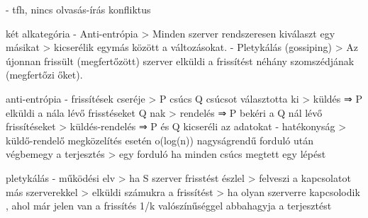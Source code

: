 \documentclass[12pt]{article}
\begin{document}
\begin{description}
                                                                        - tfh, nincs olvasás-írás konfliktus
                                                                    \item két alkategória
                                                                        - Anti-entrópia
                                                                        > Minden szerver rendszeresen kiválaszt egy másikat
                                                                        > kicserélik egymás között a változásokat.
                                                                        - Pletykálás (gossiping)
                                                                        > Az újonnan frissült (megfertőzött) szerver elküldi a frissítést néhány szomszédjának (megfertőzi őket).
                                                                    \item anti-entrópia
                                                                        - frissítések cseréje
                                                                        > P csúcs Q csúcsot választotta ki
                                                                        > küldés   ⇒ P elküldi a nála lévő frisstéseket Q nak
                                                                        > rendelés ⇒ P bekéri a Q nál lévő frissítéseket
                                                                        > küldés-rendelés ⇒ P és Q kicseréli az adatokat
                                                                        - hatékonyság
                                                                        > küldő-rendelő megközelítés esetén o(log(n)) nagyságrendű forduló után végbemegy a terjesztés
                                                                        > egy forduló ha minden csúcs megtett egy lépést
                                                                    \item pletykálás
                                                                        - működési elv
                                                                        > ha S szerver frisstést észlel
                                                                        > felveszi a kapcsolatot más szerverekkel 
                                                                        > elküldi számukra a frissítést
                                                                        > ha olyan szerverre kapcsolodik , ahol már jelen van a frissítés 1/k valószínűséggel abbahagyja a terjesztést

\end{description}
\end{document}
